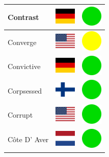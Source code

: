 \documentclass[12pt, a4paper, twoside]{report}
\begin{document}
\begin{center}
\begin{longtable}{|p{5cm}|p{2cm}|p{2cm}|}
 Contrast                                                   & \includegraphics[width=1cm]{4x3/de} &   \includegraphics[width=1cm]{likes/y} \\ \hline
 Converge                                                   & \includegraphics[width=1cm]{4x3/us} &   \includegraphics[width=1cm]{likes/m} \\ \hline
 Convictive                                                 & \includegraphics[width=1cm]{4x3/de} &   \includegraphics[width=1cm]{likes/y} \\ \hline
 Corpsessed                                                 & \includegraphics[width=1cm]{4x3/fi} &   \includegraphics[width=1cm]{likes/y} \\ \hline
 Corrupt                                                    & \includegraphics[width=1cm]{4x3/us} &   \includegraphics[width=1cm]{likes/y} \\ \hline
 Côte D' Aver                                               & \includegraphics[width=1cm]{4x3/nl} &   \includegraphics[width=1cm]{likes/y} \\ \hline

\end{longtable}
\end{center}
\end{document}
